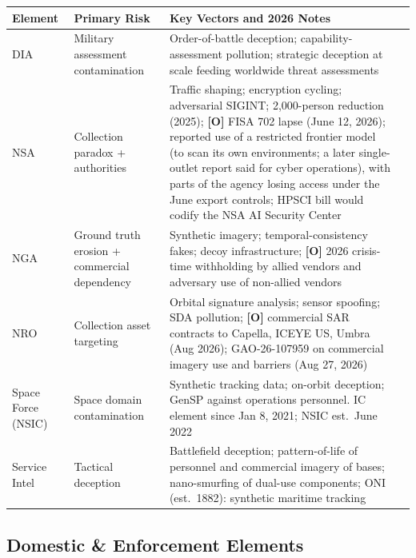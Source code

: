 \documentclass[11pt,letterpaper]{article}
\begin{document}
\begin{center}
\scriptsize
\begin{tabularx}{\linewidth}{ZY{0.37}Y{0.74}Y{1.89}}
\toprule
\textbf{Element} & \textbf{Primary Risk} & \textbf{Key Vectors and 2026 Notes} \\
\midrule
DIA & Military assessment contamination & Order-of-battle deception; capability-assessment pollution; strategic deception at scale feeding worldwide threat assessments \\
NSA & Collection paradox + authorities & Traffic shaping; encryption cycling; adversarial SIGINT; 2,000-person reduction (2025); \textbf{[O]} FISA 702 lapse (June 12, 2026); reported use of a restricted frontier model (to scan its own environments; a later single-outlet report said for cyber operations), with parts of the agency losing access under the June export controls; HPSCI bill would codify the NSA AI Security Center \\
NGA & Ground truth erosion + commercial dependency & Synthetic imagery; temporal-consistency fakes; decoy infrastructure; \textbf{[O]} 2026 crisis-time withholding by allied vendors and adversary use of non-allied vendors \\
NRO & Collection asset targeting & Orbital signature analysis; sensor spoofing; SDA pollution; \textbf{[O]} commercial SAR contracts to Capella, ICEYE US, Umbra (Aug 2026); GAO-26-107959 on commercial imagery use and barriers (Aug 27, 2026) \\
Space Force (NSIC) & Space domain contamination & Synthetic tracking data; on-orbit deception; GenSP against operations personnel. IC element since Jan 8, 2021; NSIC est.\ June 2022 \\
Service Intel & Tactical deception & Battlefield deception; pattern-of-life of personnel and commercial imagery of bases; nano-smurfing of dual-use components; ONI (est.\ 1882): synthetic maritime tracking \\
\bottomrule
\end{tabularx}
\end{center}

\subsection{Domestic \& Enforcement Elements}
\end{document}
